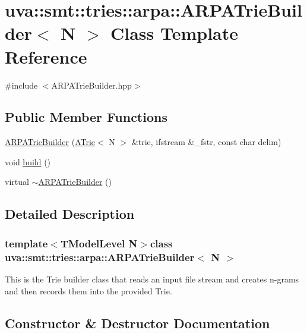 \hypertarget{classuva_1_1smt_1_1tries_1_1arpa_1_1_a_r_p_a_trie_builder}{}\section{uva\+:\+:smt\+:\+:tries\+:\+:arpa\+:\+:A\+R\+P\+A\+Trie\+Builder$<$ N $>$ Class Template Reference}
\label{classuva_1_1smt_1_1tries_1_1arpa_1_1_a_r_p_a_trie_builder}


{\ttfamily \#include $<$A\+R\+P\+A\+Trie\+Builder.\+hpp$>$}

\subsection*{Public Member Functions}
\begin{DoxyCompactItemize}
\item 
\hyperlink{classuva_1_1smt_1_1tries_1_1arpa_1_1_a_r_p_a_trie_builder_ad86b22f218b48991588838d0db6d784b}{A\+R\+P\+A\+Trie\+Builder} (\hyperlink{classuva_1_1smt_1_1tries_1_1_a_trie}{A\+Trie}$<$ N $>$ \&trie, ifstream \&\+\_\+fstr, const char delim)
\item 
void \hyperlink{classuva_1_1smt_1_1tries_1_1arpa_1_1_a_r_p_a_trie_builder_a8e01c726cb800efa9b5f157017eb35f4}{build} ()
\item 
virtual \hyperlink{classuva_1_1smt_1_1tries_1_1arpa_1_1_a_r_p_a_trie_builder_a8f0c6fc6e4f96d52b5380712b681bfef}{$\sim$\+A\+R\+P\+A\+Trie\+Builder} ()
\end{DoxyCompactItemize}


\subsection{Detailed Description}
\subsubsection*{template$<$T\+Model\+Level N$>$class uva\+::smt\+::tries\+::arpa\+::\+A\+R\+P\+A\+Trie\+Builder$<$ N $>$}

This is the Trie builder class that reads an input file stream and creates n-\/grams and then records them into the provided Trie. 

\subsection{Constructor \& Destructor Documentation}
\hypertarget{classuva_1_1smt_1_1tries_1_1arpa_1_1_a_r_p_a_trie_builder_ad86b22f218b48991588838d0db6d784b}{}
